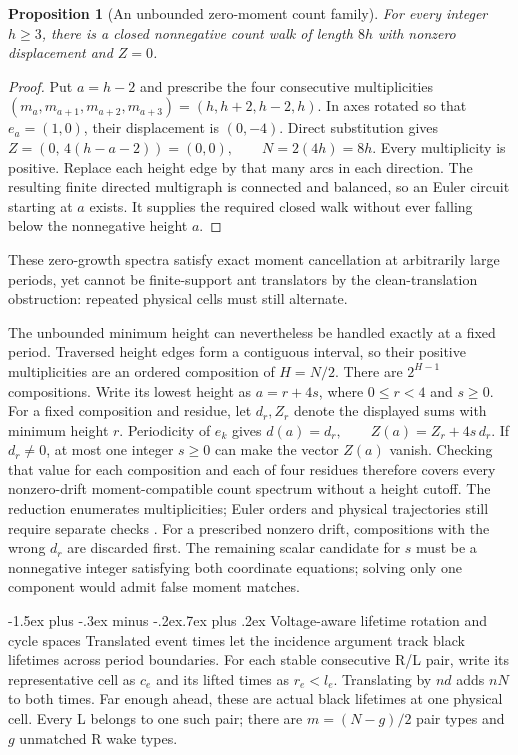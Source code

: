 \documentclass[11pt,letterpaper]{article}
\makeatletter
\renewcommand\subsection{\@startsection{subsection}{2}{\z@}%
  {-1.5ex plus -.3ex minus -.2ex}{.7ex plus .2ex}%
  {\normalfont\large\bfseries}}
\newtheorem{proposition}[theorem]{Proposition}
\makeatother
\begin{document}
\begin{proposition}[An unbounded zero-moment count family]
For every integer $h\ge3$, there is a closed nonnegative count walk
of length $8h$ with nonzero displacement and $Z=0$.
\end{proposition}
\begin{proof}
Put $a=h-2$ and prescribe the four consecutive multiplicities
$(m_a,m_{a+1},m_{a+2},m_{a+3})=(h,h+2,h-2,h)$.
In axes rotated so that $e_a=(1,0)$, their displacement is $(0,-4)$.
Direct substitution gives
$Z=(0,\,4(h-a-2))=(0,0),\qquad N=2(4h)=8h$.
Every multiplicity is positive. Replace each height edge by that many
arcs in each direction. The resulting finite directed multigraph is
connected and balanced, so an Euler circuit starting at $a$ exists.
It supplies the required closed walk without ever falling below
the nonnegative height $a$.
\end{proof}
These zero-growth spectra satisfy exact moment cancellation at arbitrarily
large periods, yet cannot be finite-support ant translators by the
clean-translation obstruction: repeated physical cells must still alternate.

The unbounded minimum height can nevertheless be handled exactly at a
fixed period. Traversed height edges form a contiguous interval, so their
positive multiplicities are an ordered composition of $H=N/2$.
There are $2^{H-1}$ compositions. Write its lowest height as
$a=r+4s$, where $0\le r<4$ and $s\ge0$. For a fixed composition
and residue, let $d_r,Z_r$ denote the displayed sums with minimum
height $r$. Periodicity of $e_k$ gives
$d(a)=d_r,\qquad Z(a)=Z_r+4s\,d_r$.
If $d_r\ne0$, at most one integer $s\ge0$ can make the vector
$Z(a)$ vanish. Checking that value for each composition and each of
four residues therefore covers every nonzero-drift moment-compatible
count spectrum without a height cutoff. The reduction enumerates multiplicities; Euler orders and physical
trajectories still require separate checks \cite{Repo}. For a prescribed nonzero drift, compositions with the wrong
$d_r$ are discarded first. The remaining scalar candidate for $s$ must
be a nonnegative integer satisfying both coordinate equations; solving
only one component would admit false moment matches.

\subsection{Voltage-aware lifetime rotation and cycle spaces}
Translated event times let the incidence argument track black lifetimes
across period boundaries.
For each stable consecutive R/L pair, write its representative cell as
$c_e$ and its lifted times as $r_e<l_e$. Translating by $nd$ adds
$nN$ to both times. Far enough ahead, these are actual black lifetimes
at one physical cell. Every L belongs to one such pair; there are
$m=(N-g)/2$ pair types and $g$ unmatched R wake types.
\end{document}
